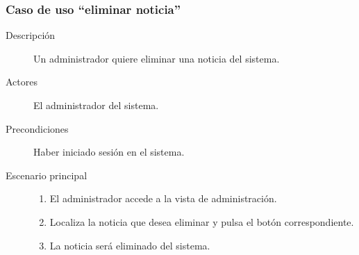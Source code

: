 \subsubsection{Caso de uso ``eliminar noticia''}
\begin{description}
\item[Descripción]  Un administrador quiere eliminar una noticia del sistema.
\item[Actores]  El administrador del sistema.
\item[Precondiciones]  Haber iniciado sesión en el sistema.
\item[Escenario principal]	\hfill
							\begin{enumerate}
							\item El administrador accede a la vista de administración.
							\item Localiza la noticia que desea eliminar y pulsa el botón correspondiente.
							\item La noticia será eliminado del sistema.
							\end{enumerate}
\end{description}